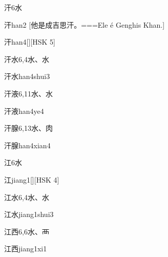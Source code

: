 \begin{Entry}{汗}{6}{⽔}
  \begin{Phonetics}{汗}{han2}
    [他是成吉思汗。===Ele é Genghis Khan.]
  \end{Phonetics}
  \begin{Phonetics}{汗}{han4}[][HSK 5]
  \end{Phonetics}
\end{Entry}

\begin{Entry}{汗水}{6,4}{⽔、⽔}
  \begin{Phonetics}{汗水}{han4shui3}
  \end{Phonetics}
\end{Entry}

\begin{Entry}{汗液}{6,11}{⽔、⽔}
  \begin{Phonetics}{汗液}{han4ye4}
  \end{Phonetics}
\end{Entry}

\begin{Entry}{汗腺}{6,13}{⽔、⾁}
  \begin{Phonetics}{汗腺}{han4xian4}
  \end{Phonetics}
\end{Entry}

\begin{Entry}{江}{6}{⽔}
  \begin{Phonetics}{江}{jiang1}[][HSK 4]
  \end{Phonetics}
\end{Entry}

\begin{Entry}{江水}{6,4}{⽔、⽔}
  \begin{Phonetics}{江水}{jiang1shui3}
  \end{Phonetics}
\end{Entry}

\begin{Entry}{江西}{6,6}{⽔、⾑}
  \begin{Phonetics}{江西}{jiang1xi1}
  \end{Phonetics}
\end{Entry}

